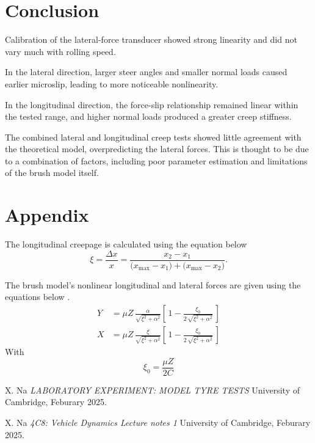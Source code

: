 \documentclass{article}
\begin{document}
\section{Conclusion}

Calibration of the lateral-force transducer showed strong linearity and did not vary much with rolling speed.

In the lateral direction, larger steer angles and smaller normal loads caused earlier microslip, leading to more noticeable nonlinearity.

In the longitudinal direction, the force-slip relationship remained linear within the tested range, and higher normal loads produced a greater creep stiffness.

The combined lateral and longitudinal creep tests showed little agreement with the theoretical model, overpredicting the lateral forces.
This is thought to be due to a combination of factors, including poor parameter estimation and limitations of the brush model itself. 

\section{Appendix}

The longitudinal creepage is calculated using the equation below
\begin{equation}
    \xi = \frac{\Delta x}{x} 
     = \frac{x_{2} - x_{1}}
            {\bigl(x_{\max} - x_{1}\bigr) + \bigl(x_{\max} - x_{2}\bigr)}.
\end{equation}

The brush model's nonlinear longitudinal and lateral forces are given using the equations below \cite{handout}.
\begin{align}
Y &= \mu Z \,\frac{\alpha}{\sqrt{\xi^2 + \alpha^2}}
\left[\,1 - \frac{\xi_0}{2\,\sqrt{\xi^2 + \alpha^2}}\,\right] \label{eq:ynonlin} \\
    X &= \mu Z \,\frac{\xi}{\sqrt{\xi^2 + \alpha^2}}
    \left[\,1 - \frac{\xi_0}{2\,\sqrt{\xi^2 + \alpha^2}}\,\right] \label{eq:xnonlin}
\end{align}
With
\begin{equation}
    \xi_0 = \frac{\mu Z}{2C}
\end{equation}

\begin{thebibliography}{9}

  X. Na
  \emph{LABORATORY EXPERIMENT: MODEL TYRE TESTS}
  University of Cambridge,
  Feburary 2025.

  X. Na
  \emph{4C8: Vehicle Dynamics Lecture notes 1}
  University of Cambridge,
  Feburary 2025.

\end{thebibliography}
\end{document}
